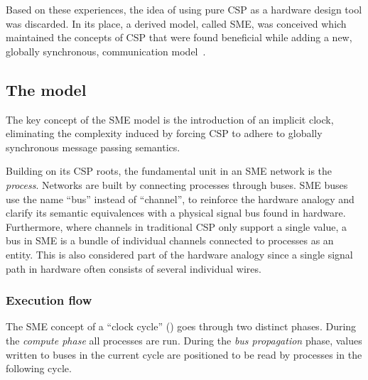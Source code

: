 Based on these experiences, the idea of using pure CSP as a hardware design tool
was discarded. In its place, a derived model, called SME, was conceived which
maintained the concepts of CSP that were found beneficial while adding a new,
globally synchronous, communication model~\cite{vinter2014synchronous}.

\subsection{The model}
The key concept of the SME model is the introduction of an implicit clock,
eliminating the complexity induced by forcing CSP to adhere to globally
synchronous message passing semantics.



Building on its CSP roots, the fundamental unit in an SME network is the
{\itshape process}.  Networks are built by connecting processes through buses.
SME buses use the name ``bus'' instead of ``channel'', to reinforce the hardware
analogy and clarify its semantic equivalences with a physical signal bus found
in hardware. Furthermore, where channels in traditional CSP only support a
single value, a bus in SME is a bundle of individual channels connected to
processes as an entity. This is also considered part of the hardware analogy
since a single signal path in hardware often consists of several individual
wires.

\subsubsection{Execution flow}
The SME concept of a ``clock cycle'' () goes through two
distinct phases. During the {\itshape compute phase} all processes are
run. During the {\itshape bus propagation} phase, values written to buses in the
current cycle are positioned to be read by processes in the following cycle.

